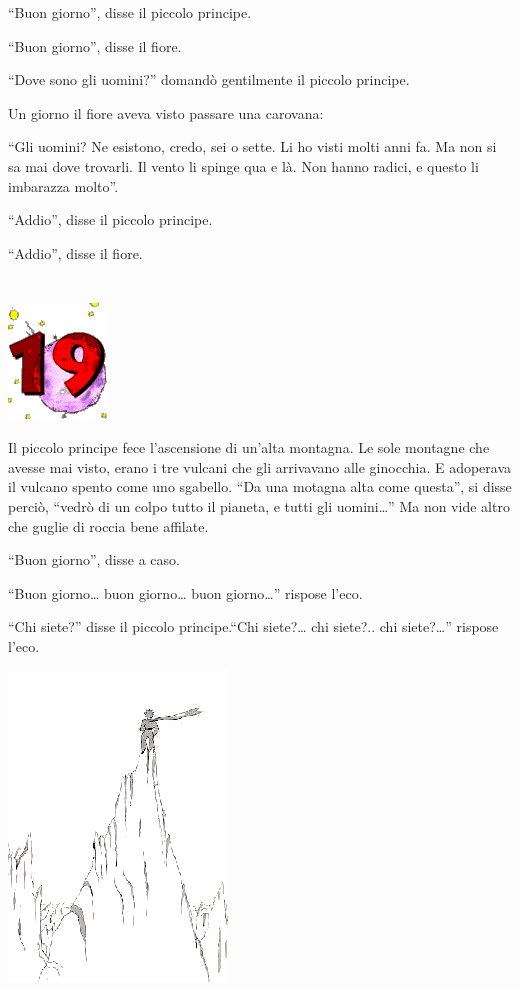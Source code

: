 \documentclass[11pt]{scrbook}
\begin{document}
``Buon giorno'', disse il piccolo principe.

``Buon giorno'', disse il fiore.

``Dove sono gli uomini?'' domandò gentilmente il piccolo principe.

Un giorno il fiore aveva visto passare una carovana:

``Gli uomini? Ne esistono, credo, sei o sette. Li ho visti molti anni fa. Ma non si sa mai dove trovarli. Il vento li spinge qua e là. Non hanno radici, e questo li imbarazza molto''.

``Addio'', disse il piccolo principe.

``Addio'', disse il fiore.

\chapter{}
\begin{center}
\includegraphics{img/chapter19}
\end{center}

Il piccolo principe fece l'ascensione di un'alta montagna. Le sole montagne che avesse mai visto, erano i tre vulcani che gli arrivavano alle ginocchia. E adoperava il vulcano spento come uno sgabello. ``Da una motagna alta come questa'', si disse perciò, ``vedrò di un colpo tutto il pianeta, e tutti gli uomini\ldots{}'' Ma non vide altro che guglie di roccia bene affilate.

``Buon giorno'', disse a caso.

``Buon giorno\ldots{} buon giorno\ldots{} buon giorno\ldots{}'' rispose l'eco.

``Chi siete?'' disse il piccolo principe.``Chi siete?\ldots{} chi siete?.. chi siete?\ldots{}'' rispose l'eco.

\begin{center}
\includegraphics{img/19a}
\end{center}
\end{document}

